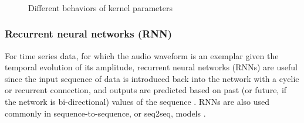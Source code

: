 \documentclass[report.tex]{subfiles}
\begin{document}
\begin{figure}[ht]
	\centering
	\\
	\\
	\\
	\caption{Different behaviors of kernel parameters \parencite[14, 29]{convguide}}
	\label{fig:convdiags}
\end{figure}

\subsubsection{Recurrent neural networks (RNN)}

For time series data, for which the audio waveform is an exemplar given the temporal evolution of its amplitude, recurrent neural networks (RNNs) are useful since the input sequence of data is introduced back into the network with a cyclic or recurrent connection, and outputs are predicted based on past (or future, if the network is bi-directional) values of the sequence \parencite{rnns}. RNNs are also used commonly in sequence-to-sequence, or seq2seq, models \parencite{seq2seqs}.
\end{document}
